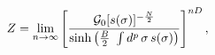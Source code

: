 \begin{equation}
   Z=  \lim_{n \to \infty}  \left[\frac{{\cal G}_0[s (\sigma)]^{-\frac{N }{2}}}{\sinh\left(\frac{B}{2}~\int
   d^p\,\sigma\, s (\sigma)\right)}\right]^{nD},  \label{311}
   \end{equation}


